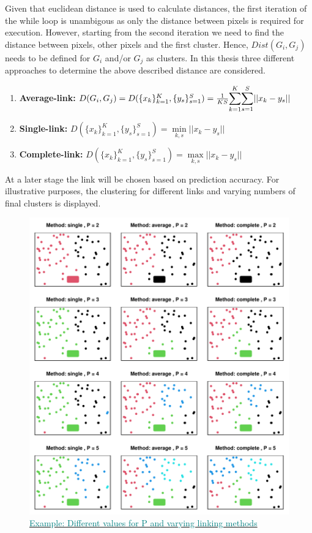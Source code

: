 \documentclass[aodsor,preprint]{imsart}
\numberwithin{equation}{section}
\theoremstyle{plain}
\begin{document}
Given that euclidean distance is used to calculate distances, the first iteration of the while loop is unambigous as only the distance between pixels is required for execution. However, starting from the second iteration we need to find the distance between pixels, other pixels and the first cluster. Hence, $Dist(G_i, G_j)$ needs to be defined for $G_i$ and/or $G_j$ as clusters. In this thesis three different approaches to determine the above described distance are considered.

\begin{enumerate}
	\item \textbf{Average-link:} $D(G_i, G_j) = D(\{x_k\}_{k = 1}^K, \{y_s\}_{s = 1}^S) = \frac{1}{KS} \mathlarger{\sum}_{k = 1}^K \mathlarger{\sum}_{s = 1}^S \lvert\lvert x_k - y_s\rvert \rvert$
	
	\item \textbf{Single-link:} $D(\{x_k\}_{k = 1}^K, \{y_s\}_{s = 1}^S) = \underset{k, s}{\min} \lvert \lvert x_k - y_s\rvert \rvert$
	
	\item \textbf{Complete-link:}  $D(\{x_k\}_{k = 1}^K, \{y_s\}_{s = 1}^S) = \underset{k, s}{\max} \lvert \lvert x_k - y_s\rvert \rvert$
\end{enumerate}

At a later stage the link will be chosen based on prediction accuracy. For illustrative purposes, the clustering for different links and varying numbers of final clusters is displayed.\newpage

\begin{figure}[H]
	\includegraphics[width = 12cm]{methodsclust.pdf}
	\caption{\href{https://github.com/Base-R-Best-R/KID/blob/main/Code/Tests/Shade_ext.pdf}{\textcolor{teal}{Example: Different values for P and varying linking methods}}}
	\label{fig5}
\end{figure}
\end{document}
